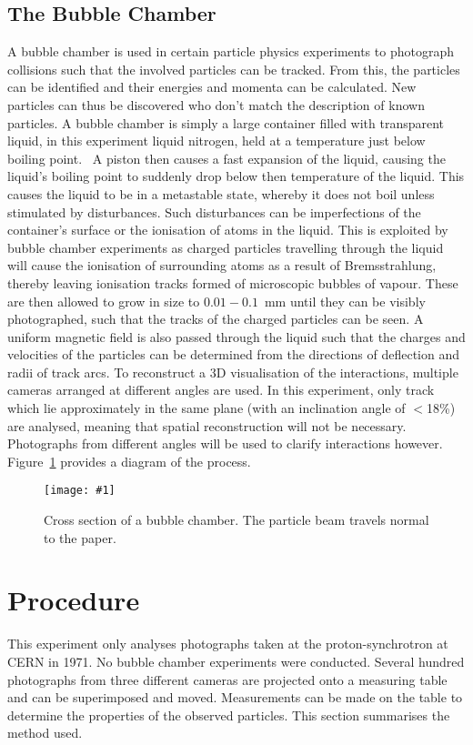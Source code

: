 \documentclass[twocolumn]{article}
\newcommand{\insertFigure}[1]{%
   \texttt{[image: \#1]}%
}
\begin{document}
\subsection{The Bubble Chamber}
A bubble chamber is used in certain particle physics experiments to photograph collisions such that the involved particles can be tracked. From this, the particles can be identified and their energies and momenta can be calculated. New particles can thus be discovered who don't match the description of known particles. A bubble chamber is simply a large container filled with transparent liquid, in this experiment liquid nitrogen, held at a temperature just below boiling point.~\cite{seul} A piston then causes a fast expansion of the liquid, causing the liquid's boiling point to suddenly drop below then temperature of the liquid. This causes the liquid to be in a metastable state, whereby it does not boil unless stimulated by disturbances. Such disturbances can be imperfections of the container's surface or the ionisation of atoms in the liquid. This is exploited by bubble chamber experiments as charged particles travelling through the liquid will cause the ionisation of surrounding atoms as a result of Bremsstrahlung, thereby leaving ionisation tracks formed of microscopic bubbles of vapour. These are then allowed to grow in size to $0.01-0.1$~mm until they can be visibly photographed, such that the tracks of the charged particles can be seen. A uniform magnetic field is also passed through the liquid such that the charges and velocities of the particles can be determined from the directions of deflection and radii of track arcs. To reconstruct a 3D visualisation of the interactions, multiple cameras arranged at different angles are used. In this experiment, only track which lie approximately in the same plane (with an inclination angle of $<$18\%) are analysed, meaning that spatial reconstruction will not be necessary. Photographs from different angles will be used to clarify interactions however. Figure~\ref{fig:bubble} provides a diagram of the process. 
\begin{figure}[!h]
	\centering
	\insertFigure{bubble.png}
	\caption{Cross section of a bubble chamber. The particle beam travels normal to the paper.~\cite{perkins}}
	\label{fig:bubble}
\end{figure}

\section{Procedure} \label{sec:Proc}
This experiment only analyses photographs taken at the proton-synchrotron at CERN in 1971. No bubble chamber experiments were conducted. Several hundred photographs from three different cameras are projected onto a measuring table and can be superimposed and moved. Measurements can be made on the table to determine the properties of the observed particles. This section summarises the method used.
\end{document}
